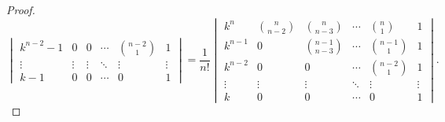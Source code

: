 \documentclass[class=nhvh-linear-algebra,crop=false]{standalone}
\begin{document}
\begin{proof}
\[\begin{vmatrix}
			k^{n-2} - 1 & 0              & 0                & \cdots & \binom{n-2}{1} & 1      \\
			\vdots      & \vdots         & \vdots           & \ddots & \vdots         & \vdots \\
			k - 1       & 0              & 0                & \cdots & 0              & 1
		\end{vmatrix}
		= \dfrac{1}{n!}
		\begin{vmatrix}
			k^{n}   & \binom{n}{n-2} & \binom{n}{n-3}   & \cdots & \binom{n}{1}   & 1      \\
			k^{n-1} & 0              & \binom{n-1}{n-3} & \cdots & \binom{n-1}{1} & 1      \\
			k^{n-2} & 0              & 0                & \cdots & \binom{n-2}{1} & 1      \\
			\vdots  & \vdots         & \vdots           & \ddots & \vdots         & \vdots \\
			k       & 0              & 0                & \cdots & 0              & 1
		\end{vmatrix}.
	\]
\end{proof}
\end{document}
